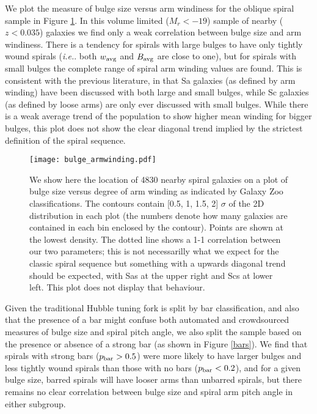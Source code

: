 \documentclass[usenatbib]{mn2e}
\newcommand{\ie}{{\it i.e.}}
\begin{document}
 We plot the measure of bulge size versus arm windiness for the oblique spiral sample in Figure \ref{bulgewinding}. In this volume limited ($M_r<-19$) sample of nearby ($z<0.035$) galaxies we find only a weak correlation between bulge size and arm windiness. There is a tendency for spirals with large bulges to have only tightly wound spirals (\ie. both $w_{\rm avg}$ and $B_{\rm avg}$ are close to one), but for spirals with small bulges the complete range of spiral arm winding values are found.  This is consistent with the previous literature, in that Sa galaxies (as defined by arm winding) have been discussed with both large and small bulges, while Sc galaxies (as defined by loose arms) are only ever discussed with small bulges. While there is a weak average trend of the population to show higher mean winding for bigger bulges, this plot does not show the clear diagonal trend implied by the strictest definition of the spiral sequence. 

 
 \begin{figure}
\texttt{[image: bulge\_armwinding.pdf]}
\caption{We show here the location of {4830} nearby spiral galaxies on a plot of bulge size versus degree of arm winding as indicated by Galaxy Zoo classifications. The contours contain [0.5, 1, 1.5, 2] $\sigma$ of the 2D distribution in each plot (the numbers denote how many galaxies are contained in each bin enclosed by the contour). Points are shown at the lowest density.  The dotted line shows a 1-1 correlation between our two parameters; this is not necessarilly what we expect for the classic spiral sequence but something with a upwards diagonal trend should be expected, with Sas at the upper right and Scs at lower left. This plot does not display that behaviour.  \label{bulgewinding}}
\end{figure}
 
 Given the traditional Hubble tuning fork is split by bar classification, and also that the presence of a bar might confuse both automated and crowdsourced measures of bulge size and spiral pitch angle, we also split the sample based on the presence or absence of a strong bar (as shown in Figure \ref{bars}). We find that spirals with strong bars ($p_{\rm bar}>0.5$)  were more likely to have larger bulges and less tightly wound spirals than those with no bars ($p_{\rm bar} < 0.2$), and for a given bulge size, barred spirals will have looser arms than unbarred spirals, but there remains no clear correlation between bulge size and spiral arm pitch angle in either subgroup.  
  
\end{document}
